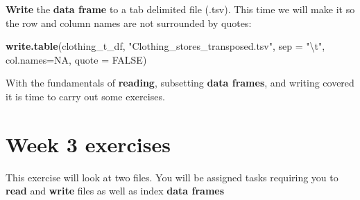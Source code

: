 \documentclass[]{book}
\newenvironment{Shaded}{\begin{snugshade}}{\end{snugshade}}
\newcommand{\KeywordTok}[1]{\textcolor[rgb]{0.13,0.29,0.53}{\textbf{#1}}}
\newcommand{\DataTypeTok}[1]{\textcolor[rgb]{0.13,0.29,0.53}{#1}}
\newcommand{\DecValTok}[1]{\textcolor[rgb]{0.00,0.00,0.81}{#1}}
\newcommand{\CharTok}[1]{\textcolor[rgb]{0.31,0.60,0.02}{#1}}
\newcommand{\StringTok}[1]{\textcolor[rgb]{0.31,0.60,0.02}{#1}}
\newcommand{\CommentTok}[1]{\textcolor[rgb]{0.56,0.35,0.01}{\textit{#1}}}
\newcommand{\OtherTok}[1]{\textcolor[rgb]{0.56,0.35,0.01}{#1}}
\newcommand{\OperatorTok}[1]{\textcolor[rgb]{0.81,0.36,0.00}{\textbf{#1}}}
\newcommand{\NormalTok}[1]{#1}
\begin{document}
\begin{Shaded}
\end{Shaded}

\textbf{Write} the \textbf{data frame} to a tab delimited file (.tsv).
This time we will make it so the row and column names are not surrounded
by quotes:

\begin{Shaded}
\begin{Highlighting}[]
\KeywordTok{write.table}\NormalTok{(clothing_t_df, }
            \StringTok{"Clothing_stores_transposed.tsv"}\NormalTok{, }
            \DataTypeTok{sep =} \StringTok{"}\CharTok{\textbackslash{}t}\StringTok{"}\NormalTok{,  }
            \DataTypeTok{col.names=}\OtherTok{NA}\NormalTok{, }
            \DataTypeTok{quote =} \OtherTok{FALSE}\NormalTok{)}
\end{Highlighting}
\end{Shaded}

With the fundamentals of \textbf{reading}, subsetting \textbf{data
frames}, and writing covered it is time to carry out some exercises.

\chapter{Week 3 exercises}\label{week-3-exercises}

This exercise will look at two files. You will be assigned tasks
requiring you to \textbf{read} and \textbf{write} files as well as index
\textbf{data frames}
\end{document}
